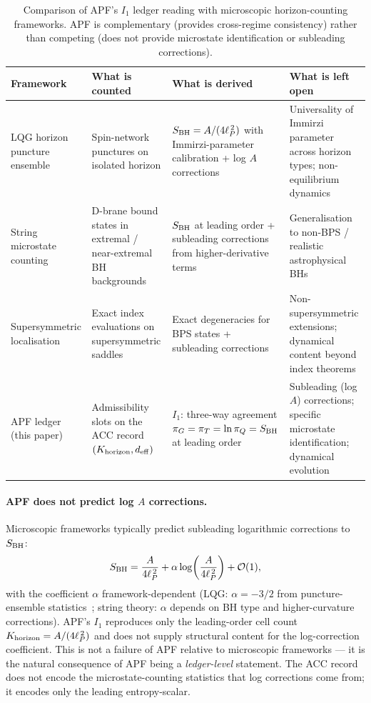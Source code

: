 \documentclass[11pt]{article}
\theoremstyle{plain}
\theoremstyle{definition}
\theoremstyle{remark}
\begin{document}
\begin{table}[h]
\centering
\footnotesize
\setlength{\tabcolsep}{4pt}
\begin{tabularx}{\textwidth}{@{}l X X X@{}}
\toprule
\textbf{Framework} & \textbf{What is counted} & \textbf{What is derived} & \textbf{What is left open} \\
\midrule
LQG horizon puncture ensemble~\cite{AshtekarBaezCorichiKrasnov1998,Agullo2212_13469,DasShankaranarayanan_0707_0615}
  & Spin-network punctures on isolated horizon
  & $S_{\rm BH} = A/(4\ell_P^{\,2})$ with Immirzi-parameter calibration + log $A$ corrections
  & Universality of Immirzi parameter across horizon types; non-equilibrium dynamics
\\
\addlinespace[3pt]
String microstate counting~\cite{Sen2206_03161}
  & D-brane bound states in extremal / near-extremal BH backgrounds
  & $S_{\rm BH}$ at leading order + subleading corrections from higher-derivative terms
  & Generalisation to non-BPS / realistic astrophysical BHs
\\
\addlinespace[3pt]
Supersymmetric localisation~\cite{SUSYloc2209_13602,holoCFT2506_22109}
  & Exact index evaluations on supersymmetric saddles
  & Exact degeneracies for BPS states + subleading corrections
  & Non-supersymmetric extensions; dynamical content beyond index theorems
\\
\addlinespace[3pt]
APF ledger (this paper)
  & Admissibility slots on the ACC record $(K_{\rm horizon}, d_{\rm eff})$
  & $I_1$: three-way agreement $\pi_G = \pi_T = \ln \pi_Q = S_{\rm BH}$ at leading order
  & Subleading (log $A$) corrections; specific microstate identification; dynamical evolution
\\
\bottomrule
\end{tabularx}
\caption{Comparison of APF's $I_1$ ledger reading with microscopic horizon-counting frameworks.  APF is complementary (provides cross-regime consistency) rather than competing (does not provide microstate identification or subleading corrections).}\label{tab:micro_compare}
\end{table}

\paragraph{APF does not predict log $A$ corrections.}  Microscopic frameworks typically predict subleading logarithmic corrections to $S_{\rm BH}$:
\[
  S_{\rm BH} = \frac{A}{4\ell_P^{\,2}} + \alpha \log\!\left(\frac{A}{4\ell_P^{\,2}}\right) + \mathcal{O}(1),
\]
with the coefficient $\alpha$ framework-dependent (LQG: $\alpha = -3/2$ from puncture-ensemble statistics~\cite{DasShankaranarayanan_0707_0615}; string theory: $\alpha$ depends on BH type and higher-curvature corrections).  APF's $I_1$ reproduces only the leading-order cell count $K_{\rm horizon} = A/(4\ell_P^{\,2})$ and does not supply structural content for the log-correction coefficient.  This is not a failure of APF relative to microscopic frameworks --- it is the natural consequence of APF being a \emph{ledger-level} statement.  The ACC record does not encode the microstate-counting statistics that log corrections come from; it encodes only the leading entropy-scalar.
\end{document}
